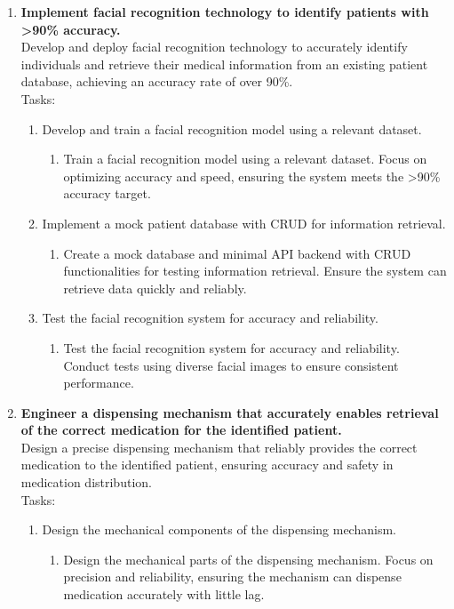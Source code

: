 \documentclass{article}
\begin{document}
\begin{enumerate}
\item \textbf{Implement facial recognition technology to identify patients with >90\% accuracy.}\\
Develop and deploy facial recognition technology to accurately identify individuals and retrieve their medical information from an existing patient database, achieving an accuracy rate of over 90\%.\\
Tasks:
\begin{enumerate}
    \item Develop and train a facial recognition model using a relevant dataset.
    \begin{enumerate}
        \item Train a facial recognition model using a relevant dataset. Focus on optimizing accuracy and speed, ensuring the system meets the >90\% accuracy target.
    \end{enumerate}

    \item Implement a mock patient database with CRUD for information retrieval.
    \begin{enumerate}
        \item Create a mock database and minimal API backend with CRUD functionalities for testing information retrieval. Ensure the system can retrieve data quickly and reliably.
    \end{enumerate}
    
    \item Test the facial recognition system for accuracy and reliability.
    \begin{enumerate}
        \item Test the facial recognition system for accuracy and reliability. Conduct tests using diverse facial images to ensure consistent performance.
    \end{enumerate}
    
\end{enumerate}

\item \textbf{Engineer a dispensing mechanism that accurately enables retrieval of the correct medication for the identified patient.}\\
Design a precise dispensing mechanism that reliably provides the correct medication to the identified patient, ensuring accuracy and safety in medication distribution.\\
Tasks:
\begin{enumerate}
    \item Design the mechanical components of the dispensing mechanism.
    \begin{enumerate}
        \item Design the mechanical parts of the dispensing mechanism. Focus on precision and reliability, ensuring the mechanism can dispense medication accurately with little lag.
    \end{enumerate}
    

\end{enumerate}
\end{enumerate}
\end{document}
